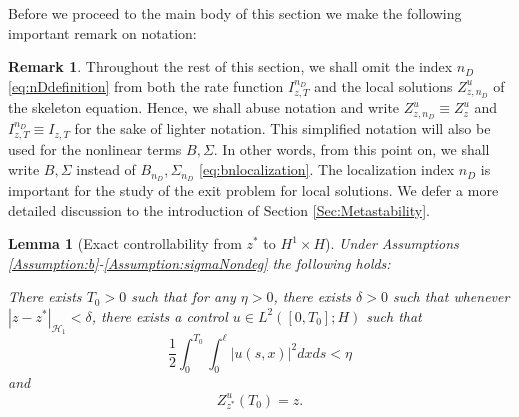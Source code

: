 \documentclass[10pt, reqno]{amsart}
\newcommand{\h}{\mathcal{H}}
\newtheorem{lem}{Lemma}
\theoremstyle{definition}
\newtheorem{rem}{Remark}
\numberwithin{lem}{section}
\numberwithin{cor}{section}
\numberwithin{prop}{section}
\numberwithin{thm}{section}
\numberwithin{dfn}{section}
\begin{document}
Before we proceed to the main body of this section we make the following important remark on notation:

\begin{rem}\label{rem:notation1} Throughout the rest of this section, we shall omit the index $n_D$ \eqref{eq:nDdefinition} from both the rate function $I^{n_D}_{z,T}$ and the local solutions $Z^u_{z, n_D}$ of the skeleton equation. Hence, we shall abuse notation and write $Z^u_{z, n_D}\equiv Z^u_{z}$ and $I^{n_D}_{z,T}\equiv I_{z,T}$ for the sake of lighter notation. This simplified notation will also be used for the nonlinear terms $B, \Sigma.$ In other words, from this point on, we shall write $B, \Sigma$ instead of $B_{n_D}, \Sigma_{n_D}$ \eqref{eq:bnlocalization}.  The localization index $n_D$ is important for the study of the exit problem for local solutions. We defer a more detailed discussion to the introduction of Section \ref{Sec:Metastability}.
\end{rem}



\begin{lem}[Exact controllability from $z^*$ to $H^1 \times H$] Under Assumptions \label{lem:exact-control} \ref{Assumption:b}-\ref{Assumption:sigmaNondeg} the following holds:

  There exists $T_0>0$ such that for any $\eta>0$, there exists $\delta>0$ such that whenever $|z-z^*|_{\h_1 }< \delta$, there exists a control $u \in L^2([0,T_0];H)$ such that
  \begin{equation*}
      \frac{1}{2}\int_0^{T_0} \int_0^\ell |u(s,x)|^2 dxds < \eta
  \end{equation*}
  and
  \begin{equation*}
      Z^{u}_{z^*}(T_0) = z.
  \end{equation*}
\end{lem}
\end{document}
